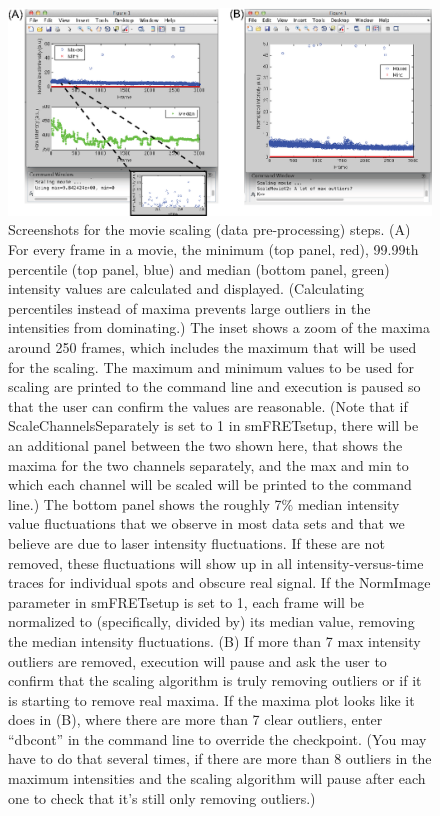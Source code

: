 \documentclass[11pt]{article}
\begin{document}
\begin{figure}
\begin{center}
\includegraphics[width=6in]{ScreenShots/ScalingScreenShots.eps}
\caption{Screenshots for the movie scaling (data pre-processing) steps. (A) For every frame in a movie, the minimum (top panel, red), 99.99th percentile (top panel, blue) and median (bottom panel, green) intensity values are calculated and displayed.  %
(Calculating percentiles instead of maxima prevents large outliers in the intensities from dominating.) The inset shows a zoom of the maxima around 250 frames, which includes the maximum that will be used for the scaling.  The maximum and minimum values to be used for scaling are printed to the command line and execution is paused so that the user can confirm the values are reasonable. (Note that if ScaleChannelsSeparately is set to 1 in smFRETsetup, there will be an additional panel between the two shown here, that shows the maxima for the two channels separately, and the max and min to which each channel will be scaled will be printed to the command line.)  The bottom panel shows the roughly 7\% median intensity value fluctuations that we observe in most data sets and that we believe are due to laser intensity fluctuations.  If these are not removed, these fluctuations will show up in all intensity-versus-time traces for individual spots and obscure real signal.  If the NormImage parameter in smFRETsetup is set to 1, each frame will be normalized to (specifically, divided by) its median value, removing the median intensity fluctuations.  (B) If more than 7 max intensity outliers are removed, execution will pause and ask the user to confirm that the scaling algorithm is truly removing outliers or if it is starting to remove real maxima.  If the maxima plot looks like it does in (B), where there are more than 7 clear outliers, enter ``dbcont'' in the command line to override the checkpoint.  (You may have to do that several times, if there are more than 8 outliers in the maximum intensities and the scaling algorithm will pause after each one to check that it's still only removing outliers.)}
\label{fig:ScaleMovieShot}
\end{center}
\end{figure}
\end{document}
